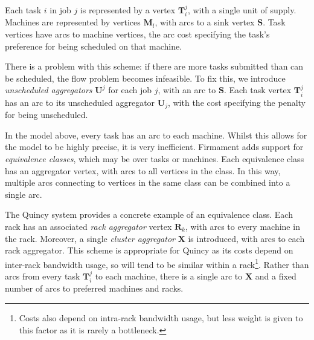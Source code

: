 Each task $i$ in job $j$ is represented by a vertex $\mathbf{T}_i^j$, with a single unit of supply. Machines are represented by vertices $\mathbf{M}_l$, with arcs to a sink vertex $\mathbf{S}$. Task vertices have arcs to machine vertices, the arc cost specifying the task's preference for being scheduled on that machine.

There is a problem with this scheme: if there are more tasks submitted than can be scheduled, the flow problem becomes infeasible. To fix this, we introduce \emph{unscheduled aggregators} $\mathbf{U}^j$ for each job $j$, with an arc to $\mathbf{S}$. Each task vertex $\mathbf{T}_i^j$ has an arc to its unscheduled aggregator $\mathbf{U}_j$, with the cost specifying the penalty for being unscheduled.

In the model above, every task has an arc to each machine. Whilst this allows for the model to be highly precise, it is very inefficient\footnotemark.
Firmament adds support for \emph{equivalence classes}, which may be over tasks or machines\footnotemark. Each equivalence class has an aggregator vertex, with arcs to all vertices in the class. In this way, multiple arcs connecting to vertices in the same class can be combined into a single arc.

The Quincy system provides a concrete example of an equivalence class. Each rack has an associated \emph{rack aggregator} vertex $\mathbf{R}_k$, with arcs to every machine in the rack. Moreover, a single \emph{cluster aggregator} $\mathbf{X}$ is introduced, with arcs to each rack aggregator. This scheme is appropriate for Quincy as its costs depend on inter-rack bandwidth usage, so will tend to be similar within a rack\footnote{Costs also depend on intra-rack bandwidth usage, but less weight is given to this factor as it is rarely a bottleneck.}. Rather than arcs from every task $\mathbf{T}_i^j$ to each machine, there is a single arc to $\mathbf{X}$ and a fixed number of arcs to preferred machines and racks.

